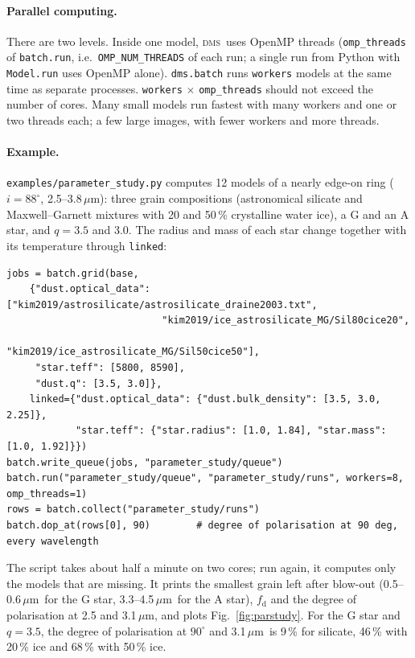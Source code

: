 \documentclass[11pt,a4paper]{article}
\newcommand{\dms}{\textsc{dms}}
\newcommand{\code}[1]{\texttt{#1}}
\newcommand{\um}{\,$\mu$m}
\begin{document}
\paragraph{Parallel computing.} There are two levels. Inside one model, \dms\ uses OpenMP threads
(\code{omp\_threads} of \code{batch.run}, i.e.\ \code{OMP\_NUM\_THREADS} of each run; a single
run from Python with \code{Model.run} uses OpenMP alone). \code{dms.batch} runs \code{workers}
models at the same time as separate processes. \code{workers} $\times$ \code{omp\_threads}
should not exceed the number of cores. Many small models run fastest with many workers and one or
two threads each; a few large images, with fewer workers and more threads.

\paragraph{Example.} \code{examples/parameter\_study.py} computes 12 models of a nearly edge-on
ring ($i=88^\circ$, 2.5--3.8\um): three grain compositions (astronomical silicate and
Maxwell--Garnett mixtures with 20 and 50\,\% crystalline water ice), a G and an A star, and
$q=3.5$ and 3.0. The radius and mass of each star change together with its temperature through
\code{linked}:

\begin{lstlisting}[style=py]
jobs = batch.grid(base,
    {"dust.optical_data": ["kim2019/astrosilicate/astrosilicate_draine2003.txt",
                           "kim2019/ice_astrosilicate_MG/Sil80cice20",
                           "kim2019/ice_astrosilicate_MG/Sil50cice50"],
     "star.teff": [5800, 8590],
     "dust.q": [3.5, 3.0]},
    linked={"dust.optical_data": {"dust.bulk_density": [3.5, 3.0, 2.25]},
            "star.teff": {"star.radius": [1.0, 1.84], "star.mass": [1.0, 1.92]}})
batch.write_queue(jobs, "parameter_study/queue")
batch.run("parameter_study/queue", "parameter_study/runs", workers=8, omp_threads=1)
rows = batch.collect("parameter_study/runs")
batch.dop_at(rows[0], 90)        # degree of polarisation at 90 deg, every wavelength
\end{lstlisting}

The script takes about half a minute on two cores; run again, it computes only the models that are
missing. It prints the smallest grain left after blow-out (0.5--0.6\um\ for the G star,
3.3--4.5\um\ for the A star), $f_\mathrm{d}$ and the degree of polarisation at 2.5 and 3.1\um,
and plots Fig.~\ref{fig:parstudy}. For the G star and $q=3.5$, the degree of polarisation at
$90^\circ$ and 3.1\um\ is 9\,\% for silicate, 46\,\% with 20\,\% ice and 68\,\% with
50\,\% ice.
\end{document}
